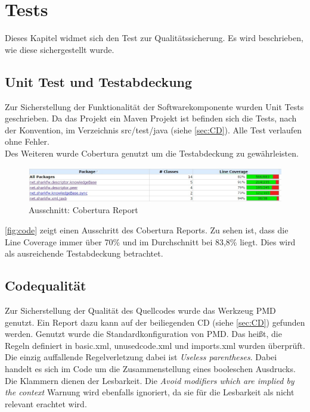 \documentclass[a4paper]{article}
\begin{document}
	\newpage
	\section{Tests}
	
	Dieses Kapitel widmet sich den Test zur Qualitätssicherung. Es wird beschrieben,
	wie diese sichergestellt wurde.
	
	\subsection{Unit Test und Testabdeckung}
	
	Zur Sicherstellung der Funktionalität der Softwarekomponente wurden Unit Tests
	geschrieben. Da das Projekt ein Maven Projekt ist befinden sich die Tests, nach
	der Konvention, im Verzeichnis src/test/java (siehe \autoref{sec:CD}). Alle
	Test verlaufen ohne Fehler. \\
	
	Des Weiteren wurde Cobertura genutzt um die Testabdeckung zu gewährleisten. \\
	
  	\begin{figure}[H]
		\includegraphics[width=\linewidth]{../Bilder/code.jpg}
		\caption{Ausschnitt: Cobertura Report}
		\label{fig:code}
	\end{figure}	
	
	\autoref{fig:code} zeigt einen Ausschritt des Cobertura Reports. Zu sehen
	ist, dass die Line Coverage immer über 70\% und im Durchschnitt bei 
	83,8\% liegt. Dies wird als ausreichende Testabdeckung betrachtet.
	
	\subsection{Codequalität}
	\label{sec:pmd}
	
	Zur Sicherstellung der Qualität des Quellcodes wurde das Werkzeug PMD genutzt.
	Ein Report dazu kann auf der beiliegenden CD	
	(siehe \autoref{sec:CD}) gefunden werden.
	Genutzt wurde die Standardkonfiguration von PMD. Das heißt, die Regeln definiert
	in basic.xml, unusedcode.xml und imports.xml wurden überprüft. Die einzig
	auffallende Regelverletzung dabei ist \emph{Useless parentheses}. Dabei
	handelt es sich im Code um die Zusammenstellung eines booleschen Ausdrucks.
	Die Klammern dienen der Lesbarkeit. Die \emph{Avoid modifiers which are implied
	by the context} Warnung wird ebenfalls ignoriert, da sie für die Lesbarkeit
	als nicht relevant erachtet wird.
	
\end{document}
